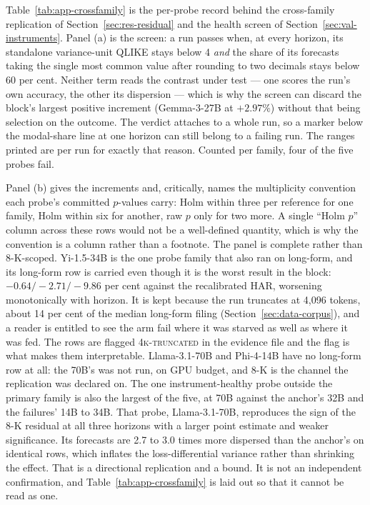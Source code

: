 Table~\ref{tab:app-crossfamily} is the per-probe record behind the
cross-family replication of Section~\ref{sec:res-residual} and the
health screen of Section~\ref{sec:val-instruments}. Panel (a) is the
screen: a run passes when, at every horizon, its standalone
variance-unit QLIKE stays below 4 \emph{and} the share of its forecasts
taking the single most common value after rounding to two decimals stays
below 60 per cent. Neither term reads the contrast under test --- one scores the run's own
accuracy, the other its dispersion --- which is why the screen can
discard the block's largest positive increment (Gemma-3-27B at
$+2.97\%$) without that being selection on the outcome. The verdict
attaches to a whole run, so a marker below the modal-share line at one
horizon can still belong to a failing run. The ranges printed are per
run for exactly that reason. Counted per family, four of the five probes
fail.

Panel (b) gives the increments and, critically, names the multiplicity
convention each probe's committed $p$-values carry: Holm within three
per reference for one family, Holm within six for another, raw $p$ only
for two more. A single ``Holm $p$'' column across these rows would not
be a well-defined quantity, which is why the convention is a column
rather than a footnote. The panel is complete rather than 8-K-scoped.
Yi-1.5-34B is the one probe family that also ran on long-form, and its
long-form row is carried even though it is the worst result in the block:
$-0.64/-2.71/-9.86$ per cent against the recalibrated HAR, worsening
monotonically with horizon. It is kept because the run truncates at 4{,}096
tokens, about 14 per cent of the median long-form filing
(Section~\ref{sec:data-corpus}), and a reader is entitled to see the arm
fail where it was starved as well as where it was fed. The rows are
flagged \textsc{4k-truncated} in the evidence file and the flag is what
makes them interpretable. %
Llama-3.1-70B and Phi-4-14B have no long-form row at all: the 70B's was
not run, on GPU budget, and 8-K is the channel the replication was
declared on. %
The one instrument-healthy probe outside the
primary family is also the largest of the five, at 70B against the
anchor's 32B and the failures' 14B to 34B. That probe, Llama-3.1-70B,
reproduces the sign of the 8-K residual
at all three horizons with a larger point estimate and weaker
significance. Its forecasts are 2.7 to 3.0 times more dispersed than
the anchor's on identical rows, which inflates the loss-differential
variance rather than shrinking the effect. %
That is a directional
replication and a bound. It is not an independent confirmation, and
Table~\ref{tab:app-crossfamily} is laid out so that it cannot be read as
one.

